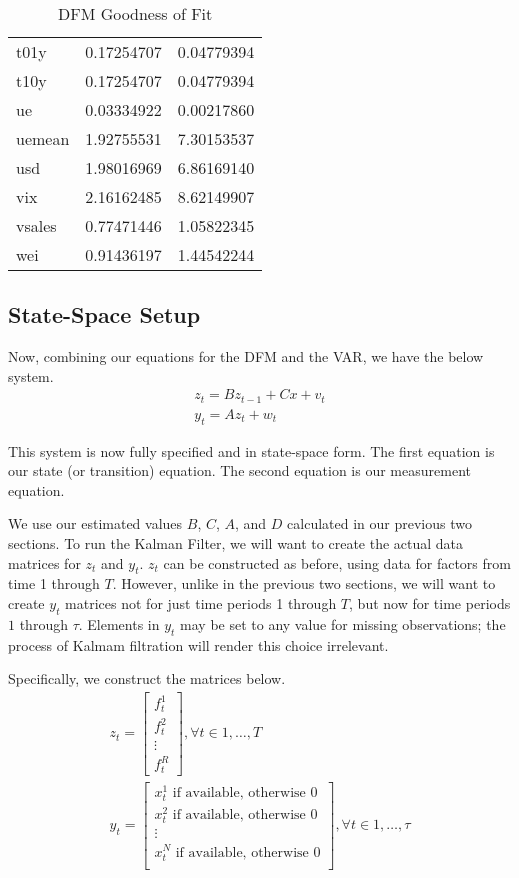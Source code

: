 \documentclass[11pt, letterpaper]{article}\usepackage[]{graphicx}\usepackage[]{color}
\begin{document}
\begin{table}[H]
\begin{tabular}{lrr}
  t01y & 0.17254707 & 0.04779394 \\ 
  t10y & 0.17254707 & 0.04779394 \\ 
  ue & 0.03334922 & 0.00217860 \\ 
  uemean & 1.92755531 & 7.30153537 \\ 
  usd & 1.98016969 & 6.86169140 \\ 
  vix & 2.16162485 & 8.62149907 \\ 
  vsales & 0.77471446 & 1.05822345 \\ 
  wei & 0.91436197 & 1.44542244 \\ 
   \hline
\end{tabular}
\endgroup
\caption{DFM Goodness of Fit} 
\end{table}





\subsection{State-Space Setup}
Now, combining our equations for the DFM and the VAR, we have the below system.
\begin{align*}
z_t = B z_{t-1} + Cx + v_t\\
y_t = A z_t + w_t
\end{align*}

This system is now fully specified and in state-space form. The first equation is our state (or transition) equation. The second equation is our measurement equation. 

We use our estimated values $B$, $C$, $A$, and $D$ calculated in our previous two sections. To run the Kalman Filter, we will want to create the actual data matrices for $z_t$ and $y_t$. $z_t$ can be constructed as before, using data for factors from time 1 through $T$. However, unlike in the previous two sections, we will want to create $y_t$ matrices not for just time periods 1 through $T$, but now for time periods $1$ through $\tau$. Elements in $y_t$ may be set to any value for missing observations; the process of Kalmam filtration will render this choice irrelevant.

Specifically, we construct the matrices below.
\begin{align*}
z_t
=
\begin{bmatrix}
	f^1_{t}\\
	f^2_{t}\\
	\vdots \\
	f^R_{t}
\end{bmatrix}, \forall t \in 1, \dots, T\\
y_t
=
\begin{bmatrix}
	\text{$x^1_{t}$ if available, otherwise 0}\\
	\text{$x^2_{t}$ if available, otherwise 0}\\
	\vdots \\
	\text{$x^N_{t}$ if available, otherwise 0}\\
\end{bmatrix}, \forall t \in 1, \dots, \tau
\end{align*}
\end{document}
